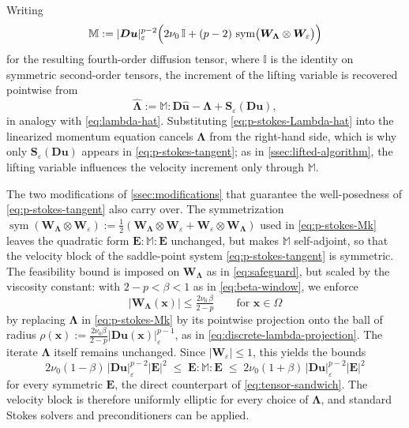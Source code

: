 \documentclass[11pt,pdflatex,sn-mathphys-num]{sn-jnl}
\theoremstyle{thmstyleone}%
\theoremstyle{thmstyletwo}%
\theoremstyle{thmstylethree}%
\newcommand{\bs}[1]{\ensuremath{\boldsymbol{#1}}}
\DeclareMathOperator{\sym}{sym}
\begin{document}
Writing
\begin{equation}\label{eq:p-stokes-Mk}
  \mathbb{M}:=|\bs{D}\bs{u}|_\varepsilon^{p-2}\Bigl(2\nu_0\,\mathbb{I}
  +(p-2)\,\sym\bigl(\bs{W}_{\!\bs\Lambda}\otimes\bs{W}_{\!\varepsilon}\bigr)\Bigr)
\end{equation}
for the resulting fourth-order diffusion tensor, where $\mathbb{I}$ is the identity on symmetric second-order tensors, the increment of the lifting variable is recovered pointwise from
\begin{equation}\label{eq:p-stokes-Lambda-hat}
  \bs{\hat\Lambda}:=\mathbb{M}:\bs{D}\bs{\hat u}-\bs{\Lambda}+\bs{S}_\varepsilon(\bs{D}\bs{u}),
\end{equation}
in analogy with \eqref{eq:lambda-hat}. Substituting \eqref{eq:p-stokes-Lambda-hat} into the linearized momentum equation cancels $\bs{\Lambda}$ from the right-hand side, which is why only $\bs{S}_\varepsilon(\bs{D}\bs{u})$ appears in \eqref{eq:p-stokes-tangent}; as in \cref{ssec:lifted-algorithm}, the lifting variable influences the velocity increment only through $\mathbb{M}$.

The two modifications of \cref{ssec:modifications} that guarantee the well-posedness of \eqref{eq:p-stokes-tangent} also carry over. The symmetrization $\sym(\bs{W}_{\!\bs\Lambda}\otimes\bs{W}_{\!\varepsilon}):=\tfrac12(\bs{W}_{\!\bs\Lambda}\otimes\bs{W}_{\!\varepsilon}+\bs{W}_{\!\varepsilon}\otimes\bs{W}_{\!\bs\Lambda})$ used in \eqref{eq:p-stokes-Mk} leaves the quadratic form $\bs{E}\!:\!\mathbb{M}\!:\!\bs{E}$ unchanged, but makes $\mathbb{M}$ self-adjoint, so that the velocity block of the saddle-point system \eqref{eq:p-stokes-tangent} is symmetric. The feasibility bound is imposed on $\bs{W}_{\!\bs\Lambda}$ as in \eqref{eq:safeguard}, but scaled by the viscosity constant: with $2-p<\beta<1$ as in \eqref{eq:beta-window}, we enforce
\begin{equation*}
  |\bs{W}_{\!\bs\Lambda}(\bs x)|\le\tfrac{2\nu_0\,\beta}{2-p}
  \qquad\text{for }\bs x\in\Omega
\end{equation*}
by replacing $\bs{\Lambda}$ in \eqref{eq:p-stokes-Mk} by its pointwise projection onto the ball of radius $\rho(\bs x):=\tfrac{2\nu_0\beta}{2-p}|\bs{D}\bs{u}(\bs x)|_\varepsilon^{p-1}$, as in \eqref{eq:discrete-lambda-projection}. The iterate $\bs{\Lambda}$ itself remains unchanged.
Since $|\bs{W}_{\!\varepsilon}|\le1$, this yields the  bounds
\begin{equation*}
  2\nu_0(1-\beta)\,|\bs{D}\bs{u}|_\varepsilon^{p-2}|\bs{E}|^2
  \;\le\;\bs{E}\!:\!\mathbb{M}\!:\!\bs{E}\;\le\;
  2\nu_0(1+\beta)\,|\bs{D}\bs{u}|_\varepsilon^{p-2}|\bs{E}|^2
\end{equation*}
for every symmetric $\bs E$, the direct counterpart of \eqref{eq:tensor-sandwich}.
The velocity block is therefore uniformly elliptic for every choice of $\bs{\Lambda}$, and standard Stokes solvers and preconditioners can be applied.
\end{document}
